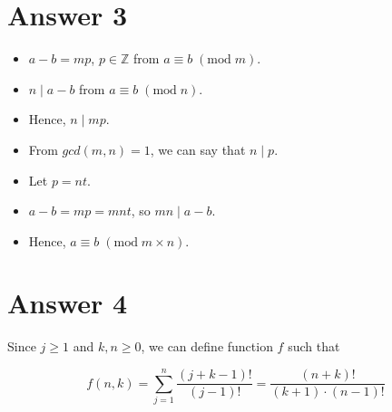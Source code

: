 \documentclass[12pt]{article}
\begin{document}
\section*{Answer 3}

\begin{itemize}
    \item $a - b = mp$, $p \in \mathbb{Z}$ from $a \equiv b \; (\text{mod} \; m)$.
    \item $n \mid a - b$ from $a \equiv b \; (\text{mod} \; n)$.
    \item Hence, $n \mid mp$.
    \item From $gcd(m, n) = 1$, we can say that $n \mid p$.
    \item Let $p = nt$.
    \item $a - b = mp = mnt$, so $mn \mid a - b$.
    \item Hence,  $a \equiv b \; (\text{mod} \; m \times n)$.
    
\end{itemize}{}

\section*{Answer 4}

Since $j \geq 1$ and $k, n \geq 0$, we can define function $f$ such that

$$f(n, k) = \sum_{j=1}^n \dfrac{(j+k-1)!}{(j-1)!} = \dfrac{(n+k)!}{(k+1) \cdot (n-1)!}$$
\end{document}
